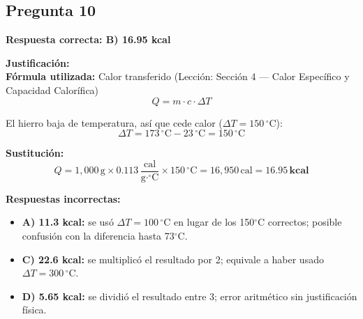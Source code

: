 \begin{respuestabox}
\subsection{Pregunta 10}
\textcolor{verdecorrecto}{\textbf{Respuesta correcta: B) 16.95 kcal}}

\textbf{Justificación:}\\
\textbf{Fórmula utilizada:} Calor transferido (Lección: Sección 4 --- Calor Específico y Capacidad Calorífica)
$$Q = m \cdot c \cdot \Delta T$$

El hierro baja de temperatura, así que cede calor ($\Delta T = 150\,^\circ$C):
$$\Delta T = 173\,^\circ\text{C} - 23\,^\circ\text{C} = 150\,^\circ\text{C}$$

\textbf{Sustitución:}
$$Q = 1{,}000\,\text{g} \times 0.113\,\frac{\text{cal}}{\text{g}\cdot^\circ\text{C}} \times 150\,^\circ\text{C} = 16{,}950\,\text{cal} = \mathbf{16.95\,\text{kcal}}$$

\textbf{Respuestas incorrectas:}
\begin{itemize}
    \item \textbf{A) 11.3 kcal:} se usó $\Delta T = 100\,^\circ$C en lugar de los 150$^\circ$C correctos; posible confusión con la diferencia hasta 73$^\circ$C.
    \item \textbf{C) 22.6 kcal:} se multiplicó el resultado por 2; equivale a haber usado $\Delta T = 300\,^\circ$C.
    \item \textbf{D) 5.65 kcal:} se dividió el resultado entre 3; error aritmético sin justificación física.
\end{itemize}
\end{respuestabox}


